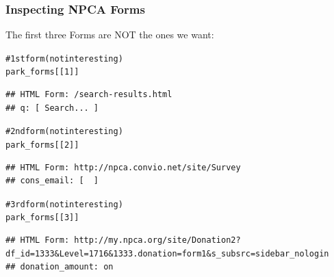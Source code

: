 \documentclass{beamer}\usepackage[]{graphicx}\usepackage[]{color}
\makeatletter
\newcommand{\hlnum}[1]{\textcolor[rgb]{0.063,0.58,0.627}{#1}}%
\newcommand{\hlcom}[1]{\textcolor[rgb]{0.588,0.588,0.588}{#1}}%
\newcommand{\hlstd}[1]{\textcolor[rgb]{0.196,0.196,0.196}{#1}}%
\newenvironment{kframe}{%
 \def\at@end@of@kframe{}%
 \ifinner\ifhmode%
  \def\at@end@of@kframe{\end{minipage}}%
  \begin{minipage}{\columnwidth}%
 \fi\fi%
 \def\FrameCommand##1{\hskip\@totalleftmargin \hskip-\fboxsep
 \colorbox{shadecolor}{##1}\hskip-\fboxsep
     \hskip-\linewidth \hskip-\@totalleftmargin \hskip\columnwidth}%
 \MakeFramed {\advance\hsize-\width
   \@totalleftmargin\z@ \linewidth\hsize
   \@setminipage}}%
 {\par\unskip\endMakeFramed%
 \at@end@of@kframe}
\newenvironment{knitrout}{}{} %
\makeatother
\begin{document}
\begin{frame}[fragile]
\frametitle{Inspecting NPCA Forms}

The first three Forms are NOT the ones we want:
\begin{knitrout}\tiny
{}\color{fgcolor}\begin{kframe}
\begin{alltt}
\hlcom{# 1st form (not interesting)}
\hlstd{park_forms[[}\hlnum{1}\hlstd{]]}
\end{alltt}
\begin{verbatim}
## HTML Form: /search-results.html 
## q: [ Search... ]
\end{verbatim}
\begin{alltt}
\hlcom{# 2nd form (not interesting)}
\hlstd{park_forms[[}\hlnum{2}\hlstd{]]}
\end{alltt}
\begin{verbatim}
## HTML Form: http://npca.convio.net/site/Survey 
## cons_email: [  ]
\end{verbatim}
\begin{alltt}
\hlcom{# 3rd form (not interesting)}
\hlstd{park_forms[[}\hlnum{3}\hlstd{]]}
\end{alltt}
\begin{verbatim}
## HTML Form: http://my.npca.org/site/Donation2?df_id=1333&Level=1716&1333.donation=form1&s_subsrc=sidebar_nologin 
## donation_amount: on
\end{verbatim}
\end{kframe}
\end{knitrout}

\end{frame}

\end{document}
